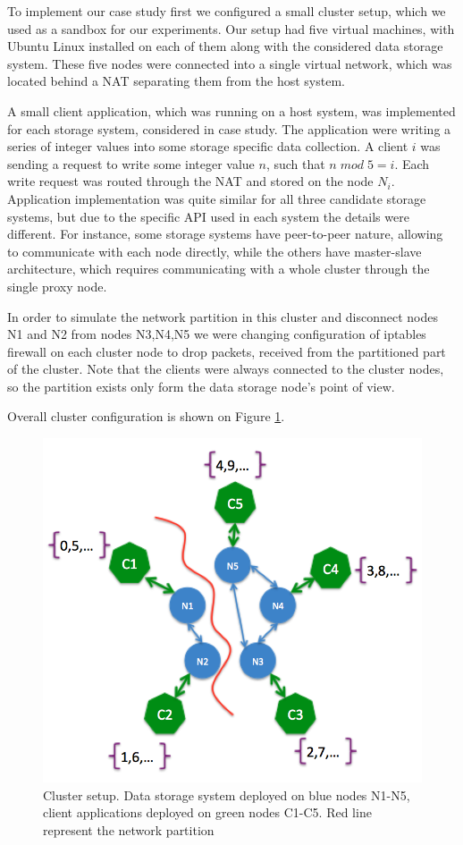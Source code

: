 \documentclass[a4paper]{article}
\begin{document}
To implement our case study first we configured a small cluster setup, which we used as a sandbox for our experiments.
Our setup had five virtual machines, with Ubuntu Linux installed on each of them along with the considered data storage system. 
These five nodes were connected into a single virtual network, which was located behind a NAT separating them from the host system.

A small client application, which was running on a host system, was implemented for each storage system, considered in case study.
The application were writing a series of integer values into some storage specific data collection.
A client $i$ was sending a request to write some integer value $n$, such that $n\;mod\;5 = i$.
Each write request was  routed through the NAT and stored on the node $N_i$. 
Application implementation was quite similar for all three candidate storage systems, but due to the specific API used in each system the details were different.
For instance, some storage systems have peer-to-peer nature, allowing to communicate with each node directly, while the others have master-slave architecture, which requires communicating with a whole cluster through the single proxy node. 

In order to simulate the network partition in this cluster and disconnect nodes N1 and N2 from nodes N3,N4,N5 we were changing configuration of iptables firewall on each cluster node to drop packets, received from the partitioned part of the cluster.
Note that the clients were always connected to the cluster nodes, so the partition exists only form the data storage node's point of view.

Overall cluster configuration is shown on Figure \ref{fig:cluster}.

\begin{figure}[h!]
	\centering
	\includegraphics{cluster}
	\caption{Cluster setup. Data storage system deployed on blue nodes N1-N5, client applications deployed on green nodes C1-C5. Red line represent the network partition}
	\label{fig:cluster}
\end{figure}
\end{document}
